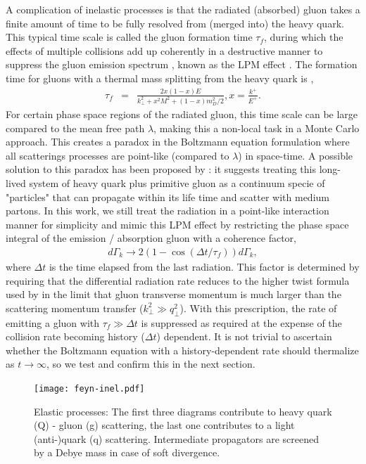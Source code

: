 \documentclass[aps, prc, reprint, amsmath, groupedaddress, nofootinbib]{revtex4-1}
\begin{document}
A complication of inelastic processes is that the radiated (absorbed) gluon takes a finite amount of time to be fully resolved from (merged into) the heavy quark.
This typical time scale is called the gluon formation time $\tau_f$, during which the effects of multiple collisions add up coherently in a destructive manner to suppress the gluon emission spectrum \cite{Wang:1994fx, Baier:1996kr, Zakharov:1996fv}, known as the LPM effect \cite{PhysRev.103.1811}.
The formation time for gluons with a thermal mass splitting from the heavy quark is \cite{Cao:2013ita},
\begin{eqnarray}
\tau_f &=& \frac{2x(1-x)E}{k_\perp^2 + x^2M^2 + (1-x)m_D^2/2}, x = \frac{k^+}{E^+}.
\end{eqnarray}
For certain phase space regions of the radiated gluon, this time scale can be large compared to the mean free path $\lambda$, making this a non-local task in a Monte Carlo approach.
This creates a paradox in the Boltzmann equation formulation where all scatterings processes are point-like (compared to $\lambda$) in space-time.
A possible solution to this paradox has been proposed by \cite{ColemanSmith:2012vr}: it suggests treating this long-lived system of heavy quark plus primitive gluon as a continuum specie of "particles" that can propagate within its life time and scatter with medium partons.
In this work, we still treat the radiation in a point-like interaction manner for simplicity and mimic this LPM effect by restricting the phase space integral of the emission / absorption gluon with a coherence factor,
\begin{eqnarray}\label{eq:LPM}
d\Gamma_k \rightarrow 2\left(1 - \cos\left(\Delta t/\tau_f\right) \right)d\Gamma_k,
\end{eqnarray}
where $\Delta t$ is the time elapsed from the last radiation.
This factor is determined by requiring that the differential radiation rate reduces to the higher twist formula used by \cite{Cao:2013ita} in the limit that gluon transverse momentum is much larger than the scattering momentum transfer ($k_\perp^2 \gg q_\perp^2$).
With this prescription, the rate of emitting a gluon with $\tau_f \gg \Delta t$ is suppressed as required at the expense of the collision rate becoming history ($\Delta t$) dependent.
It is not trivial to ascertain whether the Boltzmann equation with a history-dependent rate should thermalize as $t\rightarrow \infty$, so we test and confirm this in the next section.

\begin{figure}
\texttt{[image: feyn-inel.pdf]}
\caption{Elastic processes: The first three diagrams contribute to heavy quark (Q) - gluon (g) scattering, the last one contributes to a light (anti-)quark (q) scattering. Intermediate propagators are screened by a Debye mass in case of soft divergence.}\label{plots:feyn-elastic}
\end{figure}
\end{document}

